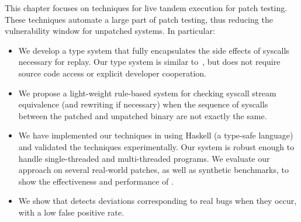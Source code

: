 This chapter focuses on techniques for
live tandem execution for patch testing.
These techniques automate a large part of patch testing, thus reducing the vulnerability window for
unpatched systems.
In particular:
\begin{itemize}
\item We develop a type system that fully encapsulates the side
  effects of syscalls necessary for replay. Our type system is similar
  to~\cite{guo:2008}, but does not require source code access or
  explicit developer cooperation.

\item We propose a light-weight rule-based system for checking syscall
  stream equivalence (and rewriting if necessary) when the sequence of
  syscalls between the patched and unpatched binary are not exactly
  the same.

\item We have implemented our techniques in \tachyon using Haskell (a type-safe
  language) and validated the techniques experimentally.  Our
  system is robust enough to handle single-threaded and
  multi-threaded programs. We evaluate our approach on several
  real-world patches, as well as synthetic benchmarks, to show the
  effectiveness and performance of \tachyon.

\item We show that \tachyon detects deviations corresponding to real bugs when they occur, with a low false positive rate. 
\end{itemize}

